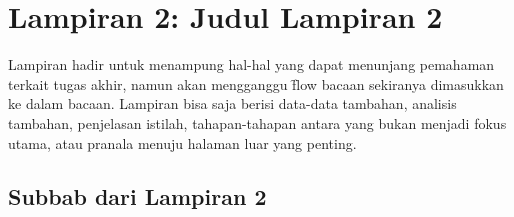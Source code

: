 \chapter*{Lampiran 2: Judul Lampiran 2}
\label{appendix:sample}
Lampiran hadir untuk menampung hal-hal yang dapat menunjang pemahaman terkait tugas akhir, namun akan mengganggu \f{flow} bacaan sekiranya dimasukkan ke dalam bacaan.
Lampiran bisa saja berisi data-data tambahan, analisis tambahan, penjelasan istilah, tahapan-tahapan antara yang bukan menjadi fokus utama, atau pranala menuju halaman luar yang penting.

\section*{Subbab dari Lampiran 2}
\label{appendix:sampleSubchap}

